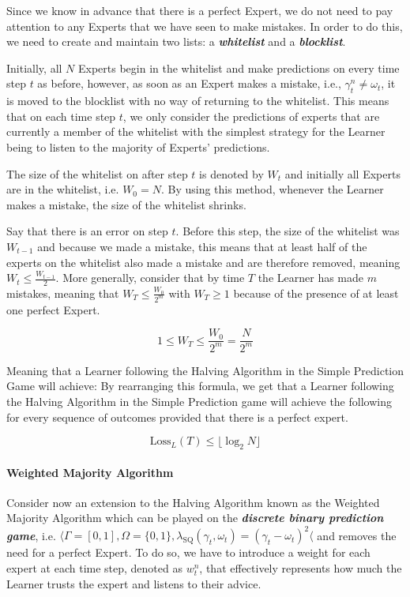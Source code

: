 Since we know in advance that there is a perfect Expert, we do not need to pay attention to any Experts that we have seen to make mistakes. In order to do this, we need to create and maintain two lists: a \textbf{\textit{whitelist}} and a \textbf{\textit{blocklist}}.

Initially, all $N$ Experts begin in the whitelist and make predictions on every time step $t$ as before, however, as soon as an Expert makes a mistake, i.e., $\gamma^n_t \neq \omega_t$, it is moved to the blocklist with no way of returning to the whitelist. This means that on each time step $t$, we only consider the predictions of experts that are currently a member of the whitelist with the simplest strategy for the Learner being to listen to the majority of Experts' predictions.

The size of the whitelist on after step $t$ is denoted by $W_t$ and initially all Experts are in the whitelist, i.e. $W_0 = N$. By using this method, whenever the Learner makes a mistake, the size of the whitelist shrinks.

Say that there is an error on step $t$. Before this step, the size of the whitelist was $W_{t-1}$ and because we made a mistake, this means that at least half of the experts on the whitelist also made a mistake and are therefore removed, meaning $W_{t} \leq \frac{W_{t-1}}{2}$. More generally, consider that by time $T$ the Learner has made $m$ mistakes, meaning that $W_T \leq \frac{W_0}{2^m}$ with $W_T \geq 1$ because of the presence of at least one perfect Expert.

\begin{equation}
    1 \leq W_T \leq \frac{W_0}{2^m} = \frac{N}{2^m}
\end{equation}

Meaning that a Learner following the Halving Algorithm in the Simple Prediction Game will achieve:
By rearranging this formula, we get that a Learner following the Halving Algorithm in the Simple Prediction game will achieve the following for every sequence of outcomes provided that there is a perfect expert.

\begin{equation}
    \text{Loss}_L(T) \leq \lfloor \log_2 N \rfloor
\end{equation}

\paragraph{Weighted Majority Algorithm}\label{paragraph:weighted_majority_algorithm}
Consider now an extension to the Halving Algorithm known as the Weighted Majority Algorithm which can be played on the \textbf{\textit{discrete binary prediction game}}, i.e. $\langle \Gamma = [0, 1], \Omega = \{0, 1\}, \lambda_\text{SQ}(\gamma_t, \omega_t) = {(\gamma_t - \omega_t)}^2 \langle$ and removes the need for a perfect Expert. To do so, we have to introduce a weight for each expert at each time step, denoted as $w^n_t$, that effectively represents how much the Learner trusts the expert and listens to their advice.

